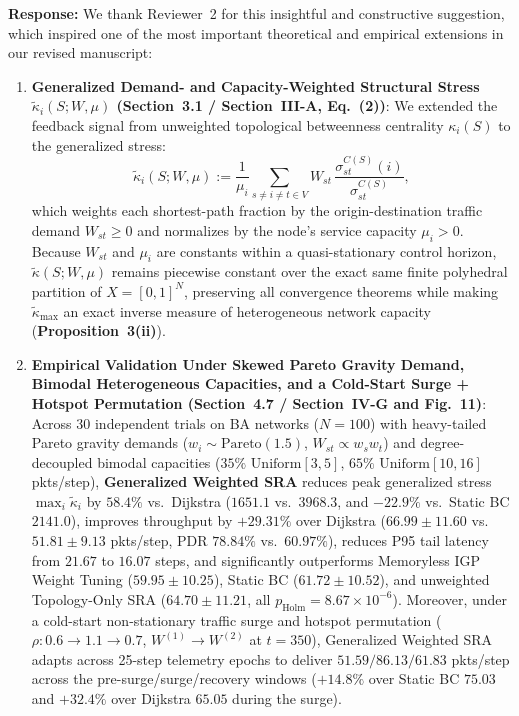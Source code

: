 \documentclass[11pt,a4paper]{article}
\begin{document}
\noindent\textbf{Response:} We thank Reviewer~2 for this insightful and constructive suggestion, which inspired one of the most important theoretical and empirical extensions in our revised manuscript:
\begin{enumerate}[leftmargin=1.8em]
    \item \textbf{Generalized Demand- and Capacity-Weighted Structural Stress $\widetilde{\kappa}_i(S;W,\mu)$ (Section~3.1 / Section~III-A, Eq.~(2))}: We extended the feedback signal from unweighted topological betweenness centrality $\kappa_i(S)$ to the generalized stress:
    \[
        \widetilde{\kappa}_i(S; W, \mu) := \frac{1}{\mu_i}\sum_{s \neq i \neq t \in V} W_{st}\,\frac{\sigma_{st}^{C(S)}(i)}{\sigma_{st}^{C(S)}},
    \]
    which weights each shortest-path fraction by the origin-destination traffic demand $W_{st} \ge 0$ and normalizes by the node's service capacity $\mu_i > 0$. Because $W_{st}$ and $\mu_i$ are constants within a quasi-stationary control horizon, $\widetilde{\kappa}(S; W, \mu)$ remains piecewise constant over the exact same finite polyhedral partition of $X=[0,1]^N$, preserving all convergence theorems while making $\widetilde{\kappa}_{\max}$ an exact inverse measure of heterogeneous network capacity (\textbf{Proposition~3(ii)}).
    \item \textbf{Empirical Validation Under Skewed Pareto Gravity Demand, Bimodal Heterogeneous Capacities, and a Cold-Start Surge + Hotspot Permutation (Section~4.7 / Section~IV-G and Fig.~11)}: Across 30 independent trials on BA networks ($N=100$) with heavy-tailed Pareto gravity demands ($w_i \sim \mathrm{Pareto}(1.5)$, $W_{st} \propto w_s w_t$) and degree-decoupled bimodal capacities ($35\%$ $\mathrm{Uniform}[3,5]$, $65\%$ $\mathrm{Uniform}[10,16]$ pkts/step), \textbf{Generalized Weighted SRA} reduces peak generalized stress $\max_i\widetilde{\kappa}_i$ by \textbf{$58.4\%$} vs.\ Dijkstra ($1651.1$ vs.\ $3968.3$, and $-22.9\%$ vs.\ Static BC $2141.0$), improves throughput by \textbf{$+29.31\%$} over Dijkstra ($66.99 \pm 11.60$ vs.\ $51.81 \pm 9.13$ pkts/step, PDR $78.84\%$ vs.\ $60.97\%$), reduces P95 tail latency from $21.67$ to $16.07$ steps, and significantly outperforms Memoryless IGP Weight Tuning ($59.95 \pm 10.25$), Static BC ($61.72 \pm 10.52$), and unweighted Topology-Only SRA ($64.70 \pm 11.21$, all $p_{\text{Holm}}=8.67 \times 10^{-6}$). Moreover, under a cold-start non-stationary traffic surge and hotspot permutation ($\rho: 0.6 \to 1.1 \to 0.7$, $W^{(1)}\to W^{(2)}$ at $t=350$), Generalized Weighted SRA adapts across 25-step telemetry epochs to deliver $51.59 / 86.13 / 61.83$ pkts/step across the pre-surge/surge/recovery windows ($+14.8\%$ over Static BC $75.03$ and $+32.4\%$ over Dijkstra $65.05$ during the surge).
\end{enumerate}
\end{document}
